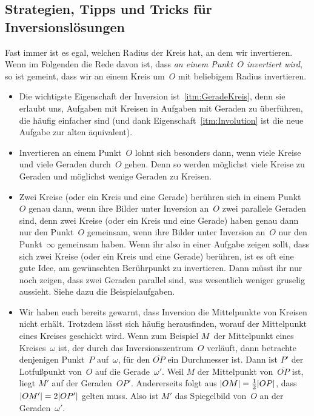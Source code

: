 \subsection*{Strategien, Tipps und Tricks für Inversionslösungen}
Fast immer ist es egal, welchen Radius der Kreis hat, an dem wir invertieren. Wenn im Folgenden die Rede davon ist, dass \emph{an einem Punkt~$O$ invertiert wird}, so ist gemeint, dass wir an einem Kreis um~$O$ mit beliebigem Radius invertieren.
\begin{itemize}
	\item Die wichtigste Eigenschaft der Inversion ist~\ref{itm:GeradeKreis}, denn sie erlaubt uns, Aufgaben mit Kreisen in Aufgaben mit Geraden zu überführen, die häufig einfacher sind (und dank Eigenschaft~\ref{itm:Involution} ist die neue Aufgabe zur alten äquivalent).
	\item Invertieren an einem Punkt~$O$ lohnt sich besonders dann, wenn viele Kreise und viele Geraden durch~$O$ gehen. Denn so werden möglichst viele Kreise zu Geraden und möglichst wenige Geraden zu Kreisen.
	\item Zwei Kreise (oder ein Kreis und eine Gerade) berühren sich in einem Punkt~$O$ genau dann, wenn ihre Bilder unter Inversion an~$O$ zwei parallele Geraden sind, denn zwei Kreise (oder ein Kreis und eine Gerade) haben genau dann nur den Punkt~$O$ gemeinsam, wenn ihre Bilder unter Inversion an~$O$ nur den Punkt~$\infty$ gemeinsam haben. Wenn ihr also in einer Aufgabe zeigen sollt, dass sich zwei Kreise (oder ein Kreis und eine Gerade) berühren, ist es oft eine gute Idee, am gewünschten Berührpunkt zu invertieren. Dann müsst ihr nur noch zeigen, dass zwei Geraden parallel sind, was wesentlich weniger gruselig aussieht. Siehe dazu die Beispielaufgaben.
	\item Wir haben euch bereits gewarnt, dass Inversion die Mittelpunkte von Kreisen nicht erhält. Trotzdem lässt sich häufig herausfinden, worauf der Mittelpunkt eines Kreises geschickt wird. Wenn zum Beispiel $M$~der Mittelpunkt eines Kreises~$\omega$ ist, der durch das Inversionszentrum~$O$ verläuft, dann betrachte denjenigen Punkt~$P$ auf~$\omega$, für den $\overline{OP}$ ein Durchmesser ist. Dann ist $P'$ der Lotfußpunkt von~$O$ auf die Gerade~$\omega'$. Weil $M$ der Mittelpunkt von~$\overline{OP}$ ist, liegt $M'$ auf der Geraden~$OP'$. Andererseits folgt aus $\lvert OM\rvert=\frac 12\lvert OP\rvert$, dass $\lvert OM'\rvert=2\lvert OP'\rvert$ gelten muss. Also ist $M'$ das Spiegelbild von~$O$ an der Geraden~$\omega'$.
	

\end{itemize}

